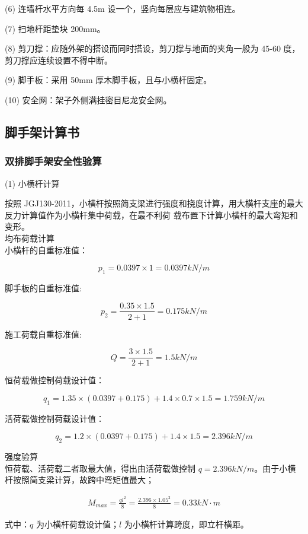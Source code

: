 (6) 连墙杆水平方向每 4.5m 设一个，竖向每层应与建筑物相连。

(7) 扫地杆距垫块 200mm。

(8) 剪刀撑：应随外架的搭设而同时搭设，剪刀撑与地面的夹角一般为 45-60 度，
剪刀撑应连续设置不得中断。

(9) 脚手板：采用 50mm 厚木脚手板，且与小横杆固定。

(10) 安全网：架子外侧满挂密目尼龙安全网。

\subsection{脚手架计算书}
\subsubsection{双排脚手架安全性验算}

(1) 小横杆计算

按照 JGJ130-2011，小横杆按照简支梁进行强度和挠度计算，用大横杆支座的最大反力计算值作为小横杆集中荷载，在最不利荷
载布置下计算小横杆的最大弯矩和变形。\\

 均布荷载计算\\

小横杆的自重标准值：

$$p_1=0.0397 \times 1=0.0397 kN/m$$

脚手板的自重标准值:

$$p_2=\frac{0.35 \times 1.5}{2+1}=0.175 kN/m$$

施工荷载自重标准值:

$$Q=\frac{3 \times 1.5}{2+1}=1.5 kN/m$$

恒荷载做控制荷载设计值：

$$q_1=1.35\times(0.0397+0.175)+1.4\times 0.7\times 1.5=1.759 kN/m$$

活荷载做控制荷载设计值：

$$q_2=1.2\times(0.0397+0.175)+1.4\times 1.5=2.396 kN/m$$

 强度验算\\

恒荷载、活荷载二者取最大值，得出由活荷载做控制 $q=2.396 kN/m$。由于小横杆按照简支梁计算，故跨中弯矩值最大；

\begin{align}
    M_{max}=\frac{ql^2}{8}=\frac{2.396\times 1.05^2}{8}=0.33 kN\cdot m
\end{align}

式中：$q$ 为小横杆荷载设计值；$l$ 为小横杆计算跨度，即立杆横距。

